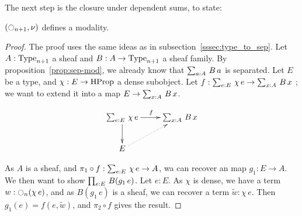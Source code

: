 The next step is the closure under dependent sums, to state:
\begin{prop}
  $(\ocircle_{n+1},\nu)$ defines a modality.
\end{prop}
\begin{proof}
  The proof uses the same ideas as in
  subsection~\ref{sssec:type_to_sep}. Let $A:\operatorname{Type}_{n+1}$ a sheaf and
  $B:A\to\operatorname{Type}_{n+1}$ a sheaf family. By
  proposition~\ref{prop:sep-mod}, we already know that $\sum_{a:A}\, B\,
    a$ is separated. Let $E$ be a type, and $\chi:E\to \operatorname{HProp}$ a
  dense subobject. Let $f:\sum_{e:E}\, \chi\, e \to \sum_{x:A}\, B\, x$
  ; we want to extend it into a map $E\to \sum_{x:A}\, B\, x$.

  \[
    \xymatrix{
      \sumD e E {\chi\, e} \ar[r]^f \ar[d] & \sumD x A {B\, x} \\
      E \ar@{.>}[ru]&
    }
  \]

  As $A$ is a sheaf, and $\pi_1\circ f:\sum_{e:E}\, \chi\, e
  \to A$, wa can recover an map $g_1:E \to A$. We then want to show
  $\prod_{e:E}\, B(g_1\, e)$. Let $e:E$. As $\chi$ is dense, we have a
  term $w:\ocircle_n(\chi\, e)$, and as $B(g_1\, e)$ is a sheaf, we can
  recover a term $\widetilde w:\chi\, e$. Then $g_1(e) =
  f(e,\widetilde w)$, and $\pi_2\circ f$ gives the result.
\end{proof}

